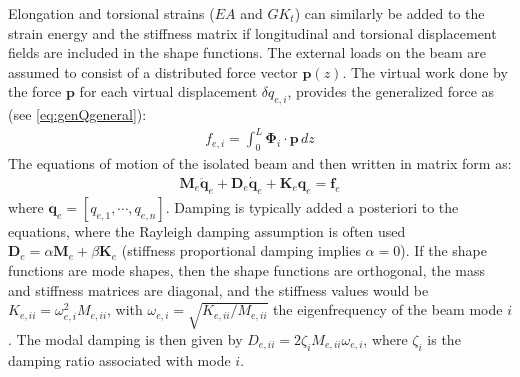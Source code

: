 \documentclass[wes, manuscript]{copernicus}
\renewcommand{\v}[1]{\boldsymbol{#1}}
\newcommand{\m}[1]{\boldsymbol{#1}}
\begin{document}
Elongation and torsional strains ($EA$ and $GK_t$) can similarly be added to the strain energy and the stiffness matrix if longitudinal and torsional displacement fields are included in the shape functions.
% 
The external loads on the beam are assumed to consist of a distributed force vector $\v{p}(z)$.
The virtual work done by the force $\v{p}$ for each virtual displacement $\delta q_{e,i}$, provides the generalized force as (see \autoref{eq:genQgeneral}): 
\begin{align}
    f_{e,i}=\int_0^L \v{\Phi}_i\cdot \v{p}\, dz
    \label{eq:GenQBeam}
\end{align}
% 
The equations of motion of the isolated beam 
 and then written in matrix form as:
\begin{align}
   \m{M}_e \v{\ddot{q}}_e + \m{D}_e\v{\dot{q}}_e + \v{K}_e\v{q}_e = \v{f}_e
\end{align}
where $\v{q}_e=[q_{e,1},\cdots,q_{e,n}]$. 
Damping is typically added a posteriori to the equations, where the Rayleigh damping assumption is often used $\v{D}_e=\alpha\m{M}_e+\beta\m{K}_e$ (stiffness proportional damping implies $\alpha=0$).
If the shape functions are mode shapes, then the shape functions are orthogonal, the mass and stiffness matrices are diagonal, and the stiffness values would be $K_{e,ii}=\omega_{e,i}^2 M_{e,ii}$, with $\omega_{e,i}=\sqrt{K_{e,ii}/M_{e,ii}}$ the eigenfrequency of the beam mode $i$.
The modal damping is then given by $D_{e,ii}= 2 \zeta_i M_{e,ii} \omega_{e,i}$, where $\zeta_i$ is the damping ratio associated with mode $i$.
\end{document}

